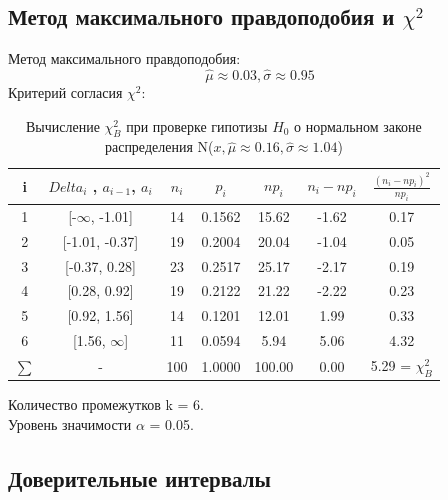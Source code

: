 \documentclass[a4]{article}
\begin{document}
		\subsection{Метод максимального правдоподобия и $\chi^2$}
		Метод максимального правдоподобия:\\
		$$\hat{\mu} \approx 0.03, \hat{\sigma} \approx 0.95$$
		Критерий согласия $\chi^2$:
		\begin{table}[h!]
			
			\caption{Вычисление $\chi^2_B$ при проверке гипотизы $H_0$ о нормальном законе распределения N($x, \hat{\mu} \approx 0.16, \hat{\sigma} \approx 1.04$)}
			\label{tab:my_label}
			\begin{center}
				\vspace{5mm}
				
				\begin{tabular}{|c|c|c|c|c|c|c|}
					\hline
					i & $Delta_i$ , $a_{i - 1}$, $a_i$          &   $n_i$ &   $p_i$ &   $np_i$ &   $n_i-np_i$ &   $\frac{(n_i-np_i)^2}{np_i}$ \\
					\hline
					1 & [-$\infty$, -1.01] & 14 &  0.1562 &    15.62 &        -1.62 &        0.17 \\
					\hline
					2 & [-1.01, -0.37]     & 19 &  0.2004 &    20.04 &        -1.04 &            0.05 \\
					\hline
					3 & [-0.37, 0.28]      &  23 &  0.2517 &    25.17 &        -2.17 &               0.19 \\
					\hline
					4 & [0.28, 0.92]       &   19 &  0.2122 &    21.22 &        -2.22 &           0.23 \\
					\hline
					5 & [0.92, 1.56]       &  14 &  0.1201 &    12.01 &         1.99 &        0.33    \\
					\hline
					6 & [1.56, $\infty$]   & 11 &  0.0594 &     5.94 &         5.06 &         4.32 \\
					\hline
					$\sum$ & -                  &     100 &  1.0000      &   100.00    &         0.00  &                         5.29 = $\chi^2_B$\\
					\hline
				\end{tabular}
			\end{center}
		\end{table}
		
		Количество промежутков k = 6.\\
		Уровень значимости $\alpha$ = 0.05.\\
		
		\subsection{Доверительные интервалы}
		
\end{document}
